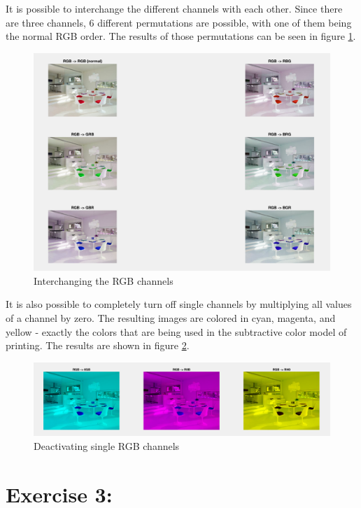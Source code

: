 \documentclass[11pt]{article}
\begin{document}
It is possible to interchange the different channels with each other. Since there are three channels, 6 different permutations are possible, with one of them being the normal RGB order. The results of those permutations can be seen in figure \ref{fig:task3}.

\begin{figure}[!hbt]
  \includegraphics[width=\textwidth]{task3}
  \caption{Interchanging the RGB channels}
  \label{fig:task3}
\end{figure}

It is also possible to completely turn off single channels by multiplying all values of a channel by zero. The resulting images are colored in cyan, magenta, and yellow - exactly the colors that are being used in the subtractive color model of printing. The results are shown in figure \ref{fig:task4}.

\begin{figure}[!hbt]
  \includegraphics[width=\textwidth]{task4}
  \caption{Deactivating single RGB channels}
  \label{fig:task4}
\end{figure}

\section*{Exercise 3:}
\end{document}
